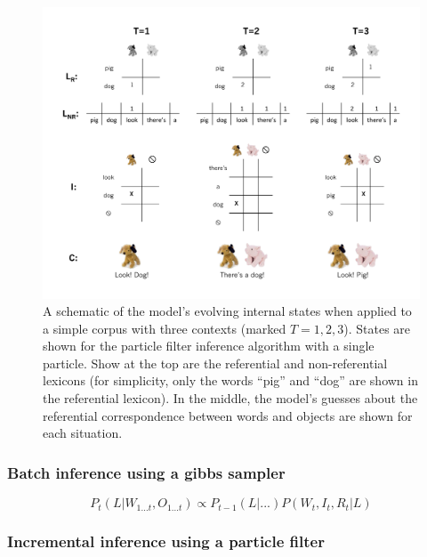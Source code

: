 \documentclass[man,noapacite,12pt]{apa2}
\begin{document}
\begin{figure}[H]
\begin{center}
\includegraphics[width=6.25in]{figures/inference_diagram.pdf}
\caption{\label{fig:inference_diagram} A schematic of the model's evolving internal states when applied to a simple corpus with three contexts (marked $T=1,2,3$). States are shown for the particle filter inference algorithm with a single particle. Show at the top are the referential and non-referential lexicons (for simplicity, only the words ``pig'' and ``dog'' are shown in the referential lexicon). In the middle, the model's guesses about the referential correspondence between words and objects are shown for each situation.}
\end{center}
\end{figure}

\subsubsection{Batch inference using a gibbs sampler}

\begin{equation}
P_t(L|W_{1...t}, O_{1...t}) \propto P_{t-1}(L | ...) P(W_t, I_t, R_t | L)
\end{equation}


\subsubsection{Incremental inference using a particle filter}
\end{document}
